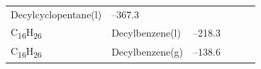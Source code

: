 \documentclass[
]{book}
\theoremstyle{definition}
\theoremstyle{definition}
\theoremstyle{definition}
\theoremstyle{remark}
\begin{document}
\begin{longtable}[]{@{}llllll@{}}
\begin{minipage}[t]{0.17\columnwidth}
Decylcyclopentane(l)\strut
\end{minipage} & \begin{minipage}[t]{0.15\columnwidth}\raggedright
--367.3\strut
\end{minipage} & \begin{minipage}[t]{0.15\columnwidth}\raggedright
\strut
\end{minipage} & \begin{minipage}[t]{0.14\columnwidth}\raggedright
\strut
\end{minipage} & \begin{minipage}[t]{0.14\columnwidth}\raggedright
\strut
\end{minipage}\tabularnewline
\begin{minipage}[t]{0.07\columnwidth}\raggedright
C\textsubscript{16}H\textsubscript{26}\strut
\end{minipage} & \begin{minipage}[t]{0.17\columnwidth}\raggedright
Decylbenzene(l)\strut
\end{minipage} & \begin{minipage}[t]{0.15\columnwidth}\raggedright
--218.3\strut
\end{minipage} & \begin{minipage}[t]{0.15\columnwidth}\raggedright
\strut
\end{minipage} & \begin{minipage}[t]{0.14\columnwidth}\raggedright
\strut
\end{minipage} & \begin{minipage}[t]{0.14\columnwidth}\raggedright
\strut
\end{minipage}\tabularnewline
\begin{minipage}[t]{0.07\columnwidth}\raggedright
C\textsubscript{16}H\textsubscript{26}\strut
\end{minipage} & \begin{minipage}[t]{0.17\columnwidth}\raggedright
Decylbenzene(g)\strut
\end{minipage} & \begin{minipage}[t]{0.15\columnwidth}\raggedright
--138.6\strut
\end{minipage} & \begin{minipage}[t]{0.15\columnwidth}\raggedright
\strut
\end{minipage} & \begin{minipage}[t]{0.14\columnwidth}\raggedright
\strut
\end{minipage} & \begin{minipage}[t]{0.14\columnwidth}\raggedright

\end{minipage}
\end{longtable}
\end{document}
